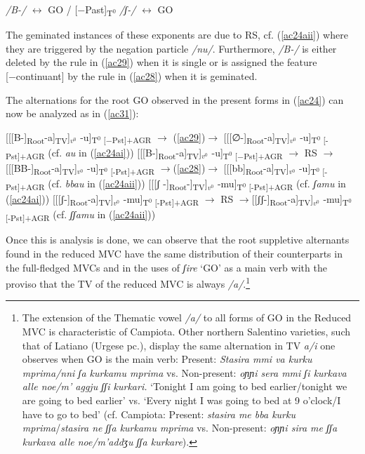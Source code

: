 \documentclass[output=paper]{langscibook}
\begin{document}
\ea\label{ac30}
    \ea \label{ac30a}\textit{/B-/} $\longleftrightarrow$ GO / \underline{\hspace{2em}}  [−Past]\textsubscript{T$^0$}
    \ex\label{ac30b} \textit{/ʃ-/} $\longleftrightarrow$ GO
    \z
\z

The geminated instances of these exponents are due to RS, cf. (\ref{ac24aii}) where they are triggered by the negation particle \textit{/nu/}. Furthermore, \textit{/B-/} is either deleted by the rule in (\ref{ac29}) when it is single or is assigned the feature [−continuant] by the rule in (\ref{ac28}) when it is geminated.

The alternations for the root GO observed in the present forms in (\ref{ac24}) can now be analyzed as in (\ref{ac31}):

\ea\label{ac31}
    \ea \label{ac31a}{[[[B-]}\textsubscript{Root}-a]\textsubscript{TV}]$_{v^0}$ -u]\textsubscript{T$^0$ [−Pst]+AGR} $\rightarrow$ (\ref{ac29})$\rightarrow$ [[[∅-]\textsubscript{Root}-a]\textsubscript{TV}]$_{v^0}$ -u]\textsubscript{T$^0$ [-Pst]+AGR}        (cf. \textit{au} in (\ref{ac24ai}))
    \ex \label{ac31b}{[[[B-]}\textsubscript{Root}-a]\textsubscript{TV}]$_{v^0}$ -u]\textsubscript{T$^0$ [−Pst]+AGR} $\rightarrow$ RS $\rightarrow$ [[[BB-]\textsubscript{Root}-a]\textsubscript{TV}]$_{v^0}$ -u]\textsubscript{T$^0$ [-Pst]+AGR}      $\rightarrow$(\ref{ac28})$\rightarrow$ [[[bb]\textsubscript{Root}-a]\textsubscript{TV}]$_{v^0}$ -u]\textsubscript{T$^0$ [-Pst]+AGR}   (cf. \textit{bbau} in (\ref{ac24aii}))
    \ex \label{ac31c}{[[[ʃ -]}\textsubscript{Root}-]\textsubscript{TV}]$_{v^0}$ -mu]\textsubscript{T$^0$ [-Pst]+AGR} (cf. \textit{ʃamu} in (\ref{ac24ai}))
    \ex \label{ac31d}{[[[ʃ-]}\textsubscript{Root}-a]\textsubscript{TV}]$_{v^0}$ -mu]\textsubscript{T$^0$ [-Pst]+AGR} $\rightarrow$ RS $\rightarrow$[[ʃʃ-]\textsubscript{Root}-a]\textsubscript{TV}]$_{v^0}$ -mu]\textsubscript{T$^0$ [-Pst]+AGR}           (cf. \textit{ʃʃamu} in (\ref{ac24aii}))
    \z
\z

Once this is analysis is done, we can observe that the root suppletive alternants found in the reduced MVC have the same distribution of their counterparts in the full-fledged MVCs and in the uses of \textit{ʃire} ‘GO’ as a main verb with the proviso that the TV of the reduced MVC is always \textit{/a/}.\footnote{The extension of the Thematic vowel \textit{/a/} to all forms of GO in the Reduced MVC is characteristic of Campiota.  Other northern  Salentino varieties, such that of Latiano (Urgese pc.), display the same alternation in TV \textit{a/i} one observes when GO is the main verb: Present: \textit{Stasira mmi va kurku mprima\slash nni ʃa kurkamu mprima} vs. Non-present: \textit{oɲɲi sera mmi ʃi kurkava alle noe\slash m’ aggju ʃʃi kurkari.} `Tonight I am going to bed earlier/tonight we are going to bed earlier' vs. `Every night I was going to bed at 9 o'clock/I have to go to bed' (cf. Campiota: Present: \textit{stasira me bba kurku mprima}\slash\textit{stasira ne ʃʃa kurkamu mprima} vs. Non-present: \textit{oɲɲi sira me ʃʃa kurkava alle noe/m'addʒu ʃʃa kurkare}).}
\end{document}
